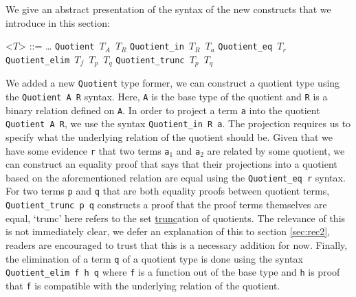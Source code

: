 \documentclass[12pt,twoside,maitrise]{dms}
\theoremstyle{definition}
\numberwithin{equation}{section}
\numberwithin{table}{chapter}
\numberwithin{figure}{chapter}
\newcommand\id[1] {\texttt{#1}}
\newcommand\fn[1] {\texttt{#1}}
\begin{document}
We give an abstract presentation of the syntax of the new constructs that we
introduce in this section:

\setlength{\grammarparsep}{20pt plus 1pt minus 1pt} %
\setlength{\grammarindent}{4em} %


\renewcommand{\syntleft}{}
\renewcommand{\syntright}{}
\begin{grammar}
<$T$> ::= \ldots
\alt{} \fn{Quotient $T_{A}$ $T_{R}$}
\alt{} \fn{Quotient_in $T_{R}$ $T_{a}$}
\alt{} \fn{Quotient_eq $T_{r}$}
\alt{} \fn{Quotient_elim $T_{f}$ $T_{p}$ $T_{q}$}
\alt{} \fn{Quotient_trunc $T_{p}$ $T_{q}$}
\end{grammar}

We added a new \id{Quotient} type former, we can construct a quotient type using
the \fn{Quotient A R} syntax. Here, \id{A} is the base type of the quotient and
\id{R} is a binary relation defined on \id{A}. In order to project a term \id{a}
into the quotient \fn{Quotient A R}, we use the syntax \fn{Quotient\_in R a}.
The projection requires us to specify what the underlying relation of the
quotient should be. Given that we have some evidence \id{r} that two terms
\id{a$_1$} and \id{a$_2$} are related by some quotient, we can construct an
equality proof that says that their projections into a quotient based on the
aforementioned relation are equal using the \fn{Quotient\_eq r} syntax. For two
terms \id{p} and \id{q} that are both equality proofs between quotient terms,
\id{Quotient\_trunc p q} constructs a proof that the proof terms themselves are
equal, `trunc' here refers to the set \underline{trunc}ation of quotients. The
relevance of this is not immediately clear, we defer an explanation of this to
section \autoref{sec:rec2}, readers are encouraged to trust that this is a
necessary addition for now. Finally, the elimination of a term \id{q} of a
quotient type is done using the syntax \fn{Quotient\_elim f h q} where \id{f} is
a function out of the base type and \id{h} is proof that \id{f} is compatible
with the underlying relation of the quotient.
\end{document}
